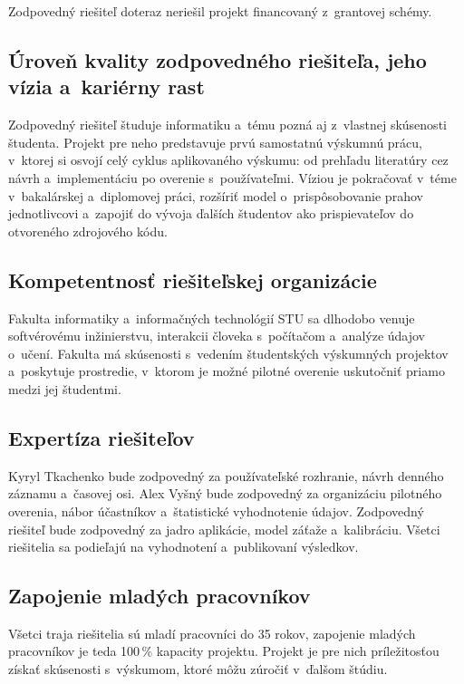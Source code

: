 \documentclass[11pt,a4paper]{article}
\begin{document}
Zodpovedný riešiteľ doteraz neriešil projekt financovaný z~grantovej schémy.

\subsection{Úroveň kvality zodpovedného riešiteľa, jeho vízia a~kariérny rast}

Zodpovedný riešiteľ študuje informatiku a~tému pozná aj z~vlastnej
skúsenosti študenta. Projekt pre neho predstavuje prvú samostatnú
výskumnú prácu, v~ktorej si osvojí celý cyklus aplikovaného výskumu: od
prehľadu literatúry cez návrh a~implementáciu po overenie s~používateľmi.
Víziou je pokračovať v~téme v~bakalárskej a~diplomovej práci, rozšíriť
model o~prispôsobovanie prahov jednotlivcovi a~zapojiť do vývoja ďalších
študentov ako prispievateľov do otvoreného zdrojového kódu.

\subsection{Kompetentnosť riešiteľskej organizácie}

Fakulta informatiky a~informačných technológií STU sa dlhodobo venuje
softvérovému inžinierstvu, interakcii človeka s~počítačom a~analýze
údajov o~učení. Fakulta má skúsenosti s~vedením študentských výskumných
projektov a~poskytuje prostredie, v~ktorom je možné pilotné overenie
uskutočniť priamo medzi jej študentmi.

\subsection{Expertíza riešiteľov}

Kyryl Tkachenko bude zodpovedný za používateľské rozhranie, návrh
denného záznamu a~časovej osi. Alex Vyšný bude zodpovedný za organizáciu
pilotného overenia, nábor účastníkov a~štatistické vyhodnotenie údajov.
Zodpovedný riešiteľ bude zodpovedný za jadro aplikácie, model záťaže
a~kalibráciu. Všetci riešitelia sa podieľajú na vyhodnotení a~publikovaní
výsledkov.

\subsection{Zapojenie mladých pracovníkov}

Všetci traja riešitelia sú mladí pracovníci do 35 rokov, zapojenie mladých
pracovníkov je teda 100\,\% kapacity projektu. Projekt je pre nich
príležitosťou získať skúsenosti s~výskumom, ktoré môžu zúročiť
v~ďalšom štúdiu.
\end{document}
